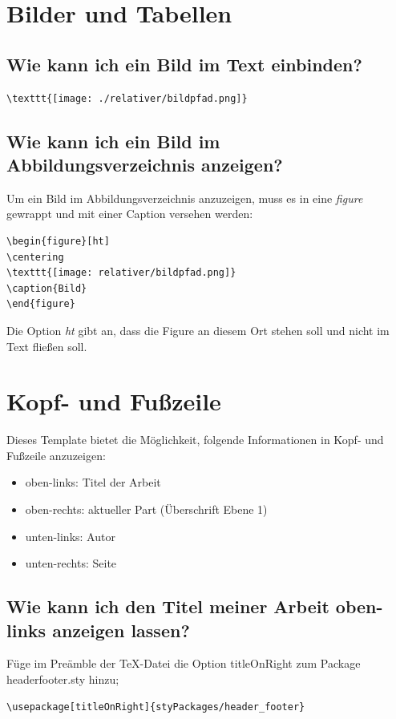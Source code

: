 \documentclass[12pt]{article}
\begin{document}
\section{Bilder und Tabellen}
\subsection{Wie kann ich ein Bild im Text einbinden?}
\begin{verbatim}
\texttt{[image: ./relativer/bildpfad.png]}
\end{verbatim}

\subsection{Wie kann ich ein Bild im Abbildungsverzeichnis anzeigen?}
Um ein Bild im Abbildungsverzeichnis anzuzeigen, muss es in eine \textit{figure} gewrappt und mit einer Caption versehen werden:
\begin{verbatim}
\begin{figure}[ht]
\centering
\texttt{[image: relativer/bildpfad.png]}
\caption{Bild}
\end{figure}
\end{verbatim}
\noindent Die Option \textit{ht} gibt an, dass die Figure an diesem Ort stehen soll und nicht im Text fließen soll.

\section{Kopf- und Fußzeile}
Dieses Template bietet die Möglichkeit, folgende Informationen in Kopf- und Fußzeile anzuzeigen:
\begin{itemize}
\item oben-links: Titel der Arbeit
\item oben-rechts: aktueller Part (Überschrift Ebene 1)
\item unten-links: Autor
\item unten-rechts: Seite
\end{itemize}

\subsection{Wie kann ich den Titel meiner Arbeit oben-links anzeigen lassen?}
Füge im Preämble der TeX-Datei die Option titleOnRight zum Package headerfooter.sty hinzu;
\begin{verbatim}
\usepackage[titleOnRight]{styPackages/header_footer}
\end{verbatim}
\end{document}
